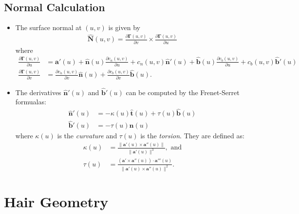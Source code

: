 \documentclass[10pt]{article}
\newcommand{\ve}[1]{\bm{#1}}
\begin{document}
\subsection{Normal Calculation}

\begin{itemize}
  \item The surface normal at $(u,v)$ is given by
  \begin{align*}
    \hat{\ve{N}}(u,v) = \frac{\partial \ve{\Gamma}(u,v)}{\partial v} \times \frac{\partial \ve{\Gamma}(u,v)}{\partial u}
  \end{align*}
  where
  \begin{align*}
  \frac{\partial \ve{\Gamma}(u,v)}{\partial u}
  &= \ve{a}'(u) + \hat{\ve{n}}(u) \frac{\partial c_n(u,v)}{\partial u}
    + c_n(u,v) \hat{\ve{n}}'(u)
    + \hat{\ve{b}}(u) \frac{\partial c_b(u,v)}{\partial u}
    + c_b(u,v) \hat{\ve{b}}'(u)\\
  \frac{\partial \ve{\Gamma}(u,v)}{\partial v}
  &= \frac{\partial c_n(u,v)}{\partial v} \hat{\ve{n}}(u) + \frac{\partial c_b(u,v)}{\partial v} \hat{\ve{b}}(u).
  \end{align*}
  
  \item The derivatives $\hat{\ve{n}}'(u)$ and $\hat{\ve{b}}'(u)$ can be computed by the Frenet-Serret formualas:
  \begin{align*}    
    \hat{\ve{n}}'(u) &= -\kappa(u)\hat{\ve{t}}(u) + \tau(u) \hat{\ve{b}}(u)\\
    \hat{\ve{b}}'(u) &= - \tau(u) \hat{\ve{n}}(u)
  \end{align*}
  where $\kappa(u)$ is the \emph{curvature} and $\tau(u)$ is the \emph{torsion}. They are defined as:
  \begin{align*}
    \kappa(u) &= \frac{\| \ve{a}'(u) \times \ve{a}''(u) \|}{\| \ve{a}'(u) \|^3}, \mbox{ and}\\
    \tau(u) &= \frac{(\ve{a}' \times \ve{a}''(u)) \cdot \ve{a}'''(u) }{\| \ve{a}'(u) \times \ve{a}''(u) \|^2}.
  \end{align*}    
\end{itemize}


\section{Hair Geometry}\label{sec:hair_geometry} %
\end{document}
